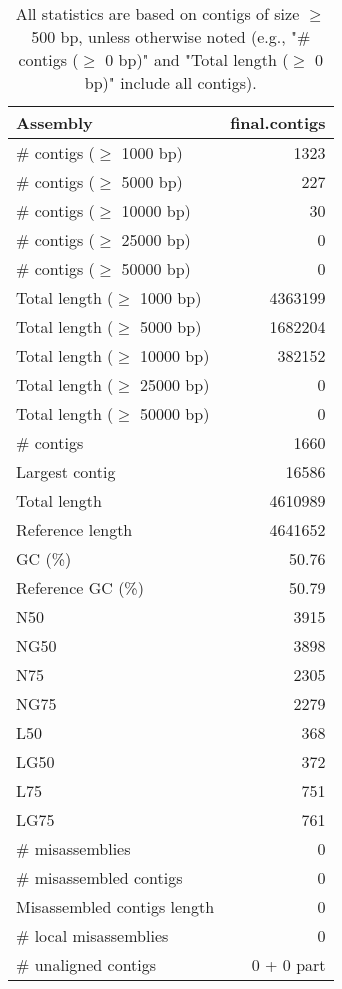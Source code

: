 \documentclass[12pt,a4paper]{article}
\begin{document}
\begin{table}[ht]
\begin{center}
\caption{All statistics are based on contigs of size $\geq$ 500 bp, unless otherwise noted (e.g., "\# contigs ($\geq$ 0 bp)" and "Total length ($\geq$ 0 bp)" include all contigs).}
\begin{tabular}{|l*{1}{|r}|}
\hline
Assembly & final.contigs \\ \hline
\# contigs ($\geq$ 1000 bp) & 1323 \\ \hline
\# contigs ($\geq$ 5000 bp) & 227 \\ \hline
\# contigs ($\geq$ 10000 bp) & 30 \\ \hline
\# contigs ($\geq$ 25000 bp) & 0 \\ \hline
\# contigs ($\geq$ 50000 bp) & 0 \\ \hline
Total length ($\geq$ 1000 bp) & 4363199 \\ \hline
Total length ($\geq$ 5000 bp) & 1682204 \\ \hline
Total length ($\geq$ 10000 bp) & 382152 \\ \hline
Total length ($\geq$ 25000 bp) & 0 \\ \hline
Total length ($\geq$ 50000 bp) & 0 \\ \hline
\# contigs & 1660 \\ \hline
Largest contig & 16586 \\ \hline
Total length & 4610989 \\ \hline
Reference length & 4641652 \\ \hline
GC (\%) & 50.76 \\ \hline
Reference GC (\%) & 50.79 \\ \hline
N50 & 3915 \\ \hline
NG50 & 3898 \\ \hline
N75 & 2305 \\ \hline
NG75 & 2279 \\ \hline
L50 & 368 \\ \hline
LG50 & 372 \\ \hline
L75 & 751 \\ \hline
LG75 & 761 \\ \hline
\# misassemblies & 0 \\ \hline
\# misassembled contigs & 0 \\ \hline
Misassembled contigs length & 0 \\ \hline
\# local misassemblies & 0 \\ \hline
\# unaligned contigs & 0 + 0 part \\ \hline

\end{tabular}
\end{center}
\end{table}
\end{document}
